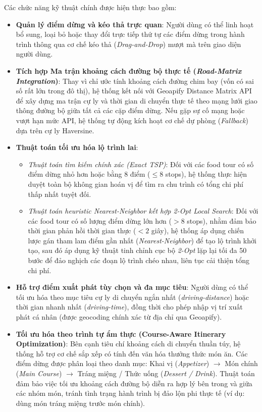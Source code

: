 Các chức năng kỹ thuật chính được hiện thực bao gồm:
\begin{itemize}[label=\textbullet]
    \item \textbf{Quản lý điểm dừng và kéo thả trực quan}: Người dùng có thể linh hoạt bổ sung, loại bỏ hoặc thay đổi trực tiếp thứ tự các điểm dừng trong hành trình thông qua cơ chế kéo thả (\textit{Drag-and-Drop}) mượt mà trên giao diện người dùng.
    \item \textbf{Tích hợp Ma trận khoảng cách đường bộ thực tế (\textit{Road-Matrix Integration})}: Thay vì chỉ ước tính khoảng cách đường chim bay (vốn có sai số rất lớn trong đô thị), hệ thống kết nối với Geoapify Distance Matrix API để xây dựng ma trận cự ly và thời gian di chuyển thực tế theo mạng lưới giao thông đường bộ giữa tất cả các cặp điểm dừng. Nếu gặp sự cố mạng hoặc vượt hạn mức API, hệ thống tự động kích hoạt cơ chế dự phòng (\textit{Fallback}) dựa trên cự ly Haversine.
    \item \textbf{Thuật toán tối ưu hóa lộ trình lai}:
    \begin{itemize}
        \item \textit{Thuật toán tìm kiếm chính xác (Exact TSP)}: Đối với các food tour có số điểm dừng nhỏ hơn hoặc bằng $8$ điểm ($\le 8$ stops), hệ thống thực hiện duyệt toàn bộ không gian hoán vị để tìm ra chu trình có tổng chi phí thấp nhất tuyệt đối.
        \item \textit{Thuật toán heuristic Nearest-Neighbor kết hợp 2-Opt Local Search}: Đối với các food tour có số lượng điểm dừng lớn hơn ($> 8$ stops), nhằm đảm bảo thời gian phản hồi thời gian thực ($< 2$ giây), hệ thống áp dụng chiến lược gán tham lam điểm gần nhất (\textit{Nearest-Neighbor}) để tạo lộ trình khởi tạo, sau đó áp dụng kỹ thuật tinh chỉnh cục bộ \textit{2-Opt} lặp lại tối đa 50 bước để đảo nghịch các đoạn lộ trình chéo nhau, liên tục cải thiện tổng chi phí.
    \end{itemize}
    \item \textbf{Hỗ trợ điểm xuất phát tùy chọn và đa mục tiêu}: Người dùng có thể tối ưu hóa theo mục tiêu cự ly di chuyển ngắn nhất (\textit{driving-distance}) hoặc thời gian nhanh nhất (\textit{driving-time}), đồng thời cho phép nhập vị trí xuất phát cá nhân (được geocoding chính xác từ địa chỉ qua Geoapify).
    \item \textbf{Tối ưu hóa theo trình tự ẩm thực (Course-Aware Itinerary Optimization)}: Bên cạnh tiêu chí khoảng cách di chuyển thuần túy, hệ thống hỗ trợ cơ chế sắp xếp có tính đến văn hóa thưởng thức món ăn. Các điểm dừng được phân loại theo danh mục: Khai vị (\textit{Appetizer}) $\rightarrow$ Món chính (\textit{Main Course}) $\rightarrow$ Tráng miệng / Thức uống (\textit{Dessert / Drink}). Thuật toán đảm bảo việc tối ưu khoảng cách đường bộ diễn ra hợp lý bên trong và giữa các nhóm món, tránh tình trạng hành trình bị đảo lộn phi thực tế (ví dụ: dùng món tráng miệng trước món chính).

\end{itemize}
